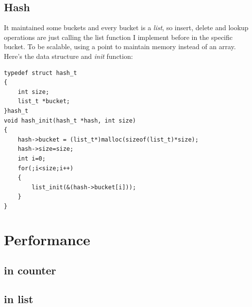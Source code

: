 \documentclass{article}
\begin{document}
		\subsection{\textbf{Hash}}
		It maintained some buckets and every bucket is a \textit{list}, so insert, delete and lookup operations are just calling the list function I implement before in the specific bucket. To be scalable, using a point to maintain memory instead of an array. Here's the data structure and \textit{init} function: \\
		\begin{lstlisting}
typedef struct hash_t
{
	int size;
	list_t *bucket;
}hash_t
void hash_init(hash_t *hash, int size)
{
	hash->bucket = (list_t*)malloc(sizeof(list_t)*size);
	hash->size=size;
	int i=0;
	for(;i<size;i++)
	{
		list_init(&(hash->bucket[i]));
	}
}

		\end{lstlisting}
	\section{Performance}
		\subsection{\textbf{in counter}}
		\begin{center}
		\end{center}
		\subsection{\textbf{in list}}
		\begin{center}
		\end{center}
\end{document}
